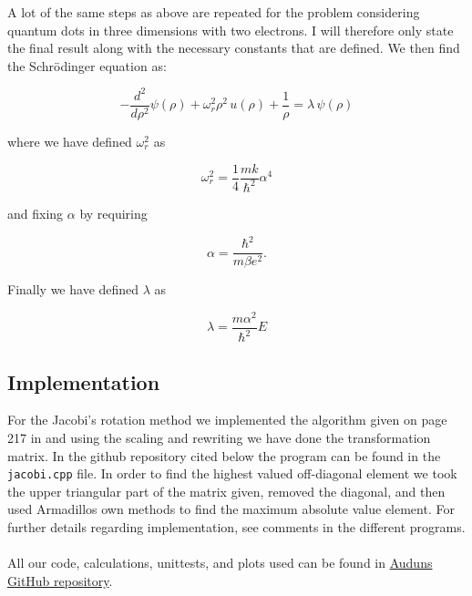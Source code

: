\documentclass[a4paper, fontsize=11pt]{article}
\begin{document}
A lot of the same steps as above are repeated for the problem considering quantum dots in three dimensions with two electrons. I will therefore only state the final result along with the necessary constants that are defined. We then find the Schr\"{o}dinger equation as:

\begin{equation}
-\dfrac{d^2}{d\rho^2}\psi(\rho) + \omega^2_{r}\rho^2 \, u(\rho) + \frac{1}{\rho} = \lambda \, \psi(\rho)
\end{equation}

where we have defined  $\omega_{r}^2$ as

\begin{equation}
\omega^2_{r}=\dfrac{1}{4} \dfrac{mk}{\hbar^2} \alpha^4
\end{equation}

and fixing $\alpha$ by requiring 

\begin{equation}
\alpha = \dfrac{\hbar^2}{m\beta e^2}.
\end{equation}

Finally we have defined $\lambda$ as

\begin{equation}
\lambda=\dfrac{m\alpha^2}{\hbar^2}E
\end{equation}



\subsection{Implementation}

For the Jacobi's rotation method we implemented the algorithm given on page 217 in \cite{Jensen} and using the scaling and rewriting we have done the transformation matrix. In the github repository cited below the program can be found in the \verb+jacobi.cpp+ file. In order to find the highest valued off-diagonal element we took the upper triangular part of the matrix given, removed the diagonal, and then used Armadillos own methods to find the maximum absolute value element. For further details regarding implementation, see comments in the different programs.


\paragraph{}
All our code, calculations, unittests, and plots used can be found in \href{https://github.com/auduntre/FYS4150/tree/master/Project%202}{Auduns GitHub repository}.
\end{document}
